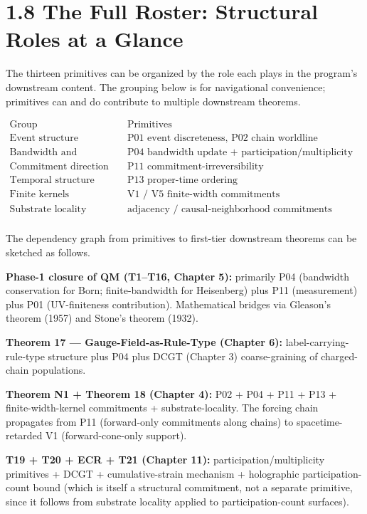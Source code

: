 \documentclass[11pt]{book}
\begin{document}
\section{1.8 The Full Roster: Structural Roles at a Glance}

The thirteen primitives can be organized by the role each plays in the program's downstream content. The grouping below is for navigational convenience; primitives can and do contribute to multiple downstream theorems.

\[
\begin{array}{l|l}
\text{Group} & \text{Primitives} \\
\hline
\text{Event structure} & \text{P01 event discreteness, P02 chain worldline} \\
\text{Bandwidth and participation} & \text{P04 bandwidth update + participation/multiplicity primitives} \\
\text{Commitment direction} & \text{P11 commitment-irreversibility} \\
\text{Temporal structure} & \text{P13 proper-time ordering} \\
\text{Finite kernels} & \text{V1 / V5 finite-width commitments} \\
\text{Substrate locality} & \text{adjacency / causal-neighborhood commitments} \\
\end{array}
\]

The dependency graph from primitives to first-tier downstream theorems can be sketched as follows.

\textbf{Phase-1 closure of QM (T1–T16, Chapter 5):} primarily P04 (bandwidth conservation for Born; finite-bandwidth for Heisenberg) plus P11 (measurement) plus P01 (UV-finiteness contribution). Mathematical bridges via Gleason's theorem (1957) and Stone's theorem (1932).

\textbf{Theorem 17 — Gauge-Field-as-Rule-Type (Chapter 6):} label-carrying-rule-type structure plus P04 plus DCGT (Chapter 3) coarse-graining of charged-chain populations.

\textbf{Theorem N1 + Theorem 18 (Chapter 4):} P02 + P04 + P11 + P13 + finite-width-kernel commitments + substrate-locality. The forcing chain propagates from P11 (forward-only commitments along chains) to spacetime-retarded V1 (forward-cone-only support).

\textbf{T19 + T20 + ECR + T21 (Chapter 11):} participation/multiplicity primitives + DCGT + cumulative-strain mechanism + holographic participation-count bound (which is itself a structural commitment, not a separate primitive, since it follows from substrate locality applied to participation-count surfaces).
\end{document}
